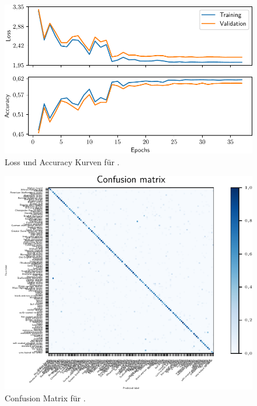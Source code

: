 \section{\PreBig}

\begin{figure}
  \centering
  \includegraphics[width=\textwidth]{pics/ergebnisse/PreBigDogNN/history_epoch.pdf}
  \caption{Loss und Accuracy Kurven für \PreBig.}
  \label{fig:loss-acc-prebig}
\end{figure}

\begin{figure}
  \centering
  \includegraphics[width=\textwidth]{pics/ergebnisse/PreBigDogNN/confusion_matrix.pdf}
  \caption{Confusion Matrix für \PreBig.}
  \label{fig:confusion-prebig}
\end{figure}
